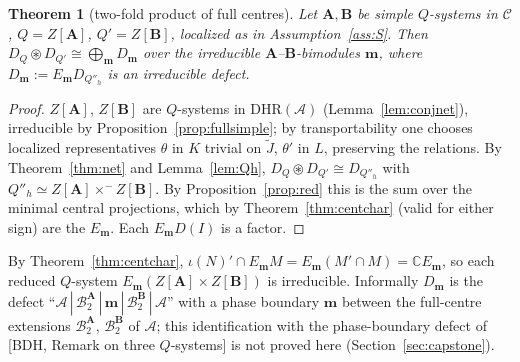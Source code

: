 \documentclass[11pt]{article}
\newtheorem{theorem}{Theorem}[section]
\theoremstyle{definition}
\theoremstyle{remark}
\newcommand{\cA}{\mathcal A}
\newcommand{\cB}{\mathcal B}
\newcommand{\bfB}{\mathbf B}
\newcommand{\bfA}{\mathbf A}
\newcommand{\cfus}{\circledast}
\begin{document}
\begin{theorem}[two-fold product of full centres]\label{thm:fullc}
Let $\bfA,\bfB$ be simple $Q$-systems in $\mathcal C$, $Q=Z[\bfA]$, $Q'=Z[\bfB]$, localized as in Assumption~\ref{ass:S}. Then $D_Q\cfus D_{Q'}\cong\bigoplus_{\mathbf m}D_{\mathbf m}$ over the irreducible $\bfA$--$\bfB$-bimodules $\mathbf m$, where $D_{\mathbf m}:=E_{\mathbf m}D_{Q''_h}$ is an irreducible defect.
\end{theorem}
\begin{proof}
$Z[\bfA]$, $Z[\bfB]$ are $Q$-systems in $\mathrm{DHR}(\cA)$ (Lemma~\ref{lem:conjnet}), irreducible by Proposition~\ref{prop:fullsimple}; by transportability one chooses localized representatives $\theta$ in $K$ trivial on $\tilde J$, $\theta'$ in $L$, preserving the relations. By Theorem~\ref{thm:net} and Lemma~\ref{lem:Qh}, $D_Q\cfus D_{Q'}\cong D_{Q''_h}$ with $Q''_h\simeq Z[\bfA]\times^-Z[\bfB]$. By Proposition~\ref{prop:red} this is the sum over the minimal central projections, which by Theorem~\ref{thm:centchar} (valid for either sign) are the $E_{\mathbf m}$. Each $E_{\mathbf m}D(I)$ is a factor.
\end{proof}
By Theorem~\ref{thm:centchar}, $\iota(N)'\cap E_{\mathbf m}M=E_{\mathbf m}(M'\cap M)=\mathbb CE_{\mathbf m}$, so each reduced $Q$-system $E_{\mathbf m}(Z[\bfA]\times Z[\bfB])$ is irreducible. Informally $D_{\mathbf m}$ is the defect ``$\cA\,|\,\cB_2^{\bfA}\,|\,\mathbf m\,|\,\cB_2^{\bfB}\,|\,\cA$'' with a phase boundary $\mathbf m$ between the full-centre extensions $\cB_2^{\bfA}$, $\cB_2^{\bfB}$ of $\cA$; this identification with the phase-boundary defect of [BDH, Remark on three $Q$-systems] is not proved here (Section~\ref{sec:capstone}).
\end{document}
